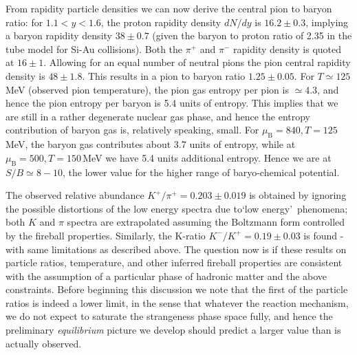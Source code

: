 \begin{mdframed}[linecolor=gray,roundcorner=12pt,backgroundcolor=Dandelion!15,linewidth=1pt,leftmargin=0cm,rightmargin=0cm,topline=true,bottomline=true,skipabove=12pt]
From rapidity particle densities we can now derive the central pion to baryon ratio: for $1.1 < y < 1.6$, the proton rapidity density $dN/dy$ is $16.2 \pm 0.3$, implying a baryon rapidity density $38 \pm 0.7$ (given the baryon to proton ratio of 2.35 in the tube model for Si-Au collisions). Both the $\pi^+$ and $\pi^-$ rapidity density is quoted at $16 \pm 1$. Allowing for an equal number of neutral pions the pion central rapidity density is $48 \pm 1.8$. This results in a pion to baryon ratio $1.25 \pm 0.05.$ For $T \simeq 125$\,MeV (observed pion temperature), the pion gas entropy per pion is $\simeq 4.3$, and hence the pion entropy per baryon is 5.4 units of entropy. This implies that we are still in a rather degenerate nuclear gas phase, and hence the entropy contribution of baryon gas is, relatively speaking, small. For $\mu_\mathrm{B} = 840, T = 125$\,MeV, the baryon gas contributes about 3.7 units of entropy, while at $\mu_\mathrm{B} = 500, T= 150$\,MeV we have 5.4 units additional entropy. Hence we are at $S/B \simeq 8 - 10 $, the lower value for the higher range of baryo-chemical potential.  

The observed relative abundance $K^+/\pi^+ = 0.203 \pm 0.019$ is obtained by ignoring the possible distortions of the low energy spectra due to\lq low energy\rq\ phenomena; both $K$ and $\pi$ spectra are extrapolated assuming the Boltzmann form controlled by the fireball properties. Similarly, the K-ratio $K^-/K^+ = 0.19 \pm 0.03 $ is found - with same limitations as described above. The question now is if these results on particle ratios, temperature, and other inferred fireball properties are consistent with the assumption of a particular phase of hadronic matter and the above constraints. Before beginning this discussion we note that the first of the particle ratios is indeed a lower limit, in the sense that whatever the reaction mechanism, we do not expect to saturate the strangeness phase space fully, and hence the preliminary {\it equilibrium} picture we develop should predict a larger value than is actually observed.  


\end{mdframed}
